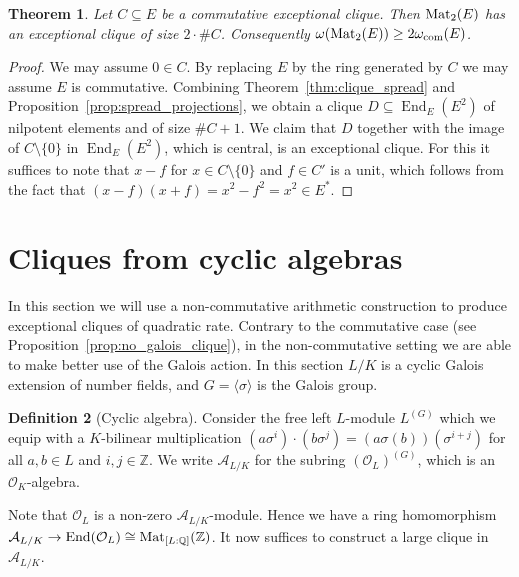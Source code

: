 \documentclass{amsart}
\theoremstyle{plain}
\newtheorem{theorem}{Theorem}[section]
\theoremstyle{definition}
\newtheorem{definition}[theorem]{Definition}
\DeclareMathOperator{\End}{End}
\newcommand{\Z}{\ensuremath{\mathbb{Z}}}
\newcommand{\Q}{\ensuremath{\mathbb{Q}}}
\newcommand{\clq}{C}
\newcommand{\clqb}{D}
\begin{document}
\begin{theorem}\label{thm:clique_doubling}
	Let \(\clq\subseteq E\) be a commutative exceptional clique. Then \(\textup{Mat}_2(E)\) has an exceptional clique of size \(2\cdot \#\clq\). Consequently \(\omega(\textup{Mat}_2(E))\geq 2\omega_{\textup{com}}(E)\).
\end{theorem}
\begin{proof}
	We may assume \(0\in \clq\). By replacing \(E\) by the ring generated by \(\clq\) we may assume \(E\) is commutative. Combining Theorem~\ref{thm:clique_spread} and Proposition~\ref{prop:spread_projections}, we obtain a clique \(\clqb\subseteq\End_E(E^2)\) of nilpotent elements and of size \(\#\clq+1\). We claim that \(\clqb\) together with the image of \(\clq\setminus\{0\}\) in \(\End_E(E^2)\), which is central, is an exceptional clique. For this it suffices to note that \(x-f\) for \(x\in \clq\setminus \{0\}\) and \(f\in \clq'\) is a unit, which follows from the fact that \((x-f)(x+f)=x^2-f^2=x^2\in E^*\).
\end{proof}


\section{Cliques from cyclic algebras}\label{sec:cyclicalgebras}

In this section we will use a non-commutative arithmetic construction to produce exceptional cliques of quadratic rate. 
Contrary to the commutative case (see Proposition~\ref{prop:no_galois_clique}), in the non-commutative setting we are able to make better use of the Galois action.
In this section \(L/K\) is a cyclic Galois extension of number fields, and \(G=\langle \sigma\rangle\) is the Galois group.

\begin{definition}[Cyclic algebra]
	Consider the free left \(L\)-module \(L^{(G)}\) which we equip with a \(K\)-bilinear multiplication \((a\sigma^i) \cdot (b \sigma^j) = (a\sigma(b)) (\sigma^{i+j})\) for all \(a,b\in L\) and \(i,j\in\Z\). 
	We write \(\mathcal{A}_{L/K}\) for the subring \((\mathcal{O}_L)^{(G)}\), which is an \(\mathcal{O}_K\)-algebra.
\end{definition}

Note that \(\mathcal{O}_L\) is a non-zero \(\mathcal{A}_{L/K}\)-module.
Hence we have a ring homomorphism \\ \(\mathcal{A}_{L/K}\to\End(\mathcal{O}_L)\cong \textup{Mat}_{[L:\Q]}(\Z)\). It now suffices to construct a large clique in \(\mathcal{A}_{L/K}\).
\end{document}
